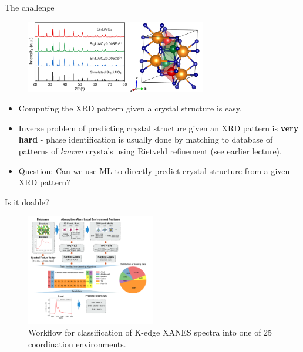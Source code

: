 \documentclass[aspectratio=169]{beamer}
\begin{document}
\begin{frame}{The challenge}
\begin{figure}
    \centering
    \includegraphics[width=0.7\textwidth]{figures/xrd_pattern.png}
\end{figure}
    \begin{itemize}
        \item Computing the XRD pattern given a crystal structure is easy.
        \item Inverse problem of predicting crystal structure given an XRD pattern is \textbf{very hard} - phase identification is usually done by matching to database of patterns of \textit{known} crystals using Rietveld refinement (see earlier lecture).
        \item Question: Can we use ML to directly predict crystal structure from a given XRD pattern?
    \end{itemize}
\end{frame}


\begin{frame}{Is it doable?}
\begin{figure}
    \centering
    \includegraphics[width=0.5\textwidth]{figures/randomforestxanes.pdf}
    \caption{Workflow for classification of K-edge XANES spectra into one of 25 coordination environments.\cite{zhengRandomForestModels2019}}
\end{figure}
\end{frame}
\end{document}
